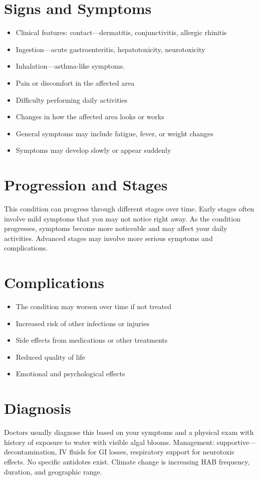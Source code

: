 \section{Signs and Symptoms}

\begin{itemize}[noitemsep]
  \item Clinical features: contact---dermatitis, conjunctivitis, allergic rhinitis
  \item Ingestion---acute gastroenteritis, hepatotoxicity, neurotoxicity
  \item Inhalation---asthma-like symptoms.
  \item Pain or discomfort in the affected area
  \item Difficulty performing daily activities
  \item Changes in how the affected area looks or works
  \item General symptoms may include fatigue, fever, or weight changes
  \item Symptoms may develop slowly or appear suddenly
\end{itemize}

\section{Progression and Stages}
This condition can progress through different stages over time. Early stages often involve mild symptoms that you may not notice right away. As the condition progresses, symptoms become more noticeable and may affect your daily activities. Advanced stages may involve more serious symptoms and complications.

\section{Complications}

\begin{itemize}[noitemsep]
  \item The condition may worsen over time if not treated
  \item Increased risk of other infections or injuries
  \item Side effects from medications or other treatments
  \item Reduced quality of life
  \item Emotional and psychological effects
\end{itemize}

\section{Diagnosis}
Doctors usually diagnose this based on your symptoms and a physical exam with history of exposure to water with visible algal blooms. Management: supportive---decontamination, IV fluids for GI losses, respiratory support for neurotoxic effects. No specific antidotes exist. Climate change is increasing HAB frequency, duration, and geographic range.

